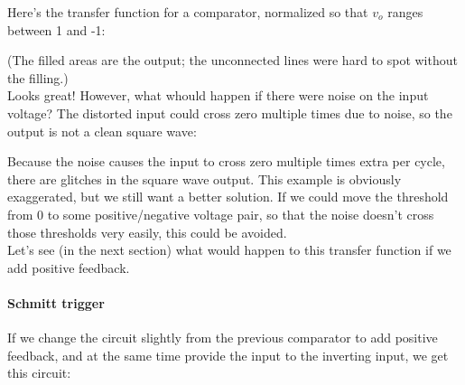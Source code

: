 Here's the transfer function for a comparator, normalized so that $v_o$ ranges between 1 and -1:

\begin{comment}
Plot[{Sin[x], Sign[Sin[x]]} , {x, 0, 3 \[Pi]}, Filling -> {2 -> Axis}]
\end{comment}


(The filled areas are the output; the unconnected lines were hard to spot without the filling.)\\
Looks great! However, what whould happen if there were noise on the input voltage? The distorted input could cross zero multiple times due to noise, so the output is not a clean square wave:

\begin{comment}
Plot[{Sin[x] + 1/4 Sin[25 x + \[Pi]/3], 
Sign[Sin[x] + 1/4 Sin[25 x + \[Pi]/3]]} , {x, 0, 3 \[Pi]}, 
Filling -> {2 -> Axis}]
\end{comment}


Because the noise causes the input to cross zero multiple times extra per cycle, there are glitches in the square wave output. This example is obviously exaggerated, but we still want a better solution. If we could move the threshold from 0 to some positive/negative voltage pair, so that the noise doesn't cross those thresholds very easily, this could be avoided.\\
Let's see (in the next section) what would happen to this transfer function if we add positive feedback.

\newpage

\paragraph{Schmitt trigger}

If we change the circuit slightly from the previous comparator to add positive feedback, and at the same time provide the input to the inverting input, we get this circuit:\\

